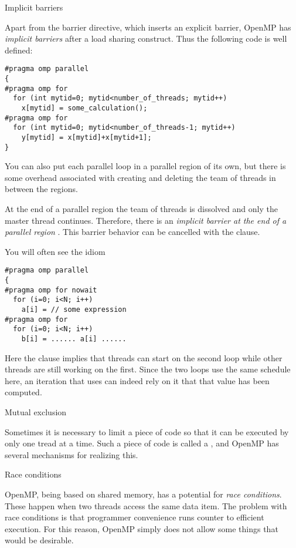  {Implicit barriers}
\label{sec:ompbarrierimpl}

Apart from the barrier directive, which inserts an explicit barrier,
OpenMP has \emph{implicit barriers} after
a load sharing construct. Thus the following code is well defined:
\begin{lstlisting}
#pragma omp parallel 
{
#pragma omp for
  for (int mytid=0; mytid<number_of_threads; mytid++)
    x[mytid] = some_calculation();
#pragma omp for
  for (int mytid=0; mytid<number_of_threads-1; mytid++)
    y[mytid] = x[mytid]+x[mytid+1];
}
\end{lstlisting}

You can also put each parallel loop in a parallel region of its own,
but there is some overhead associated with creating and deleting the
team of threads in between the regions.

At the end of a parallel region the team of threads is dissolved and
only the master thread continues. Therefore, there is an
\emph{implicit barrier at the end of a parallel region}%
.
This barrier behavior can be cancelled with the 
clause.

You will often see the idiom
\begin{lstlisting}
#pragma omp parallel
{
#pragma omp for nowait
  for (i=0; i<N; i++)
    a[i] = // some expression
#pragma omp for
  for (i=0; i<N; i++)
    b[i] = ...... a[i] ......
\end{lstlisting}
Here the  clause implies that threads can start on the second loop
while other threads are still working on the first. Since the two loops use the same
schedule here, an iteration that uses  can indeed rely on it that that 
value has been computed.

 {Mutual exclusion}

Sometimes it is necessary to limit a piece of code
so that it can be executed by only one tread at a time.
Such a piece of code is called a , and
OpenMP has several mechanisms for realizing this.

 {Race conditions}

OpenMP, being based on shared memory, has a potential for \emph{race
  conditions}. These happen when two threads access the same data
item. The problem with race conditions is that programmer convenience
runs counter to efficient execution. For this reason, OpenMP simply
does not allow some things that would be desirable.

